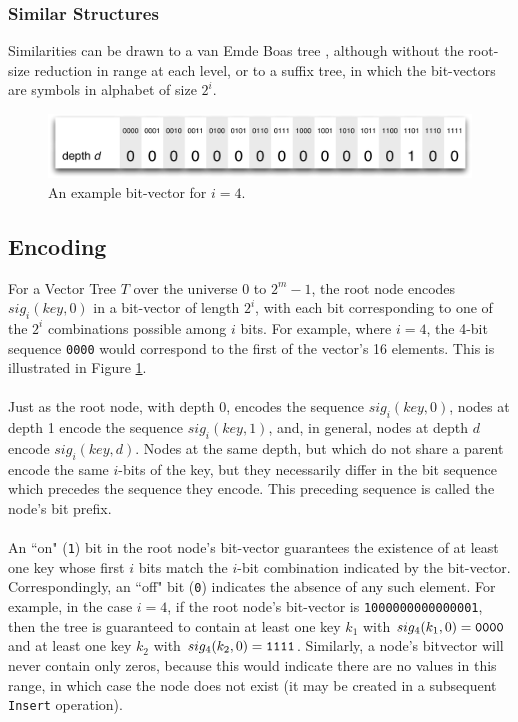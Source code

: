 \documentclass[11pt,letterpaper]{article}
\begin{document}
\subsubsection{Similar Structures}
Similarities can be drawn to a van Emde Boas tree \cite{wiki:001},
although without the root-size reduction in range at each level, or to a suffix tree, in
which the bit-vectors are symbols in alphabet of size $2^i$.

\begin{figure}[t]
	\center
	\includegraphics[width=0.98\linewidth]{example-vector.pdf}
	\caption{An example bit-vector for $i=4$.}
	\label{fig:example-vector}
\end{figure}

\subsection{Encoding}
For a Vector Tree $T$ over the universe $0$ to $2^m - 1$, the root node
encodes $sig_i(key, 0)$ in a bit-vector of length $2^i$,
with each bit corresponding to one of the $2^i$ combinations possible
among $i$ bits.  For example, where $i=4$, the 4-bit sequence {\tt 0000}
would correspond to the first of the vector's 16 elements.  This is illustrated
in Figure \ref{fig:example-vector}.

\paragraph{}
Just as the root node, with depth 0, encodes the sequence $sig_i(key, 0)$,
nodes at depth 1 encode the sequence $sig_i(key, 1)$, and,
in general, nodes at depth $d$ encode $sig_i(key, d)$.  Nodes at the
same depth, but which do not share a parent encode the same $i$-bits
of the key, but they necessarily differ in the bit sequence which precedes
the sequence they encode.  This preceding sequence is called the node's
bit prefix.

\paragraph{}
An ``on" ({\tt 1}) bit in the root node's bit-vector guarantees the existence
of at least one key whose first $i$ bits match the $i$-bit combination
indicated by the bit-vector.  Correspondingly, an ``off" bit ({\tt 0}) indicates
the absence of any such element.  For example, in the case $i=4$,
if the root node's bit-vector is {\tt 1000000000000001}, then the tree is
guaranteed to contain at least one key $k_1$ with $sig_4(k_1, 0) = {\tt 0000}$
and at least one key $k_2$ with $sig_4(k_2, 0)={\tt 1111}$.  Similarly, a node's
bitvector will never contain only zeros, because this would indicate there are
no values in this range, in which case the node does not exist (it may be created
in a subsequent {\tt Insert} operation).
\end{document}
